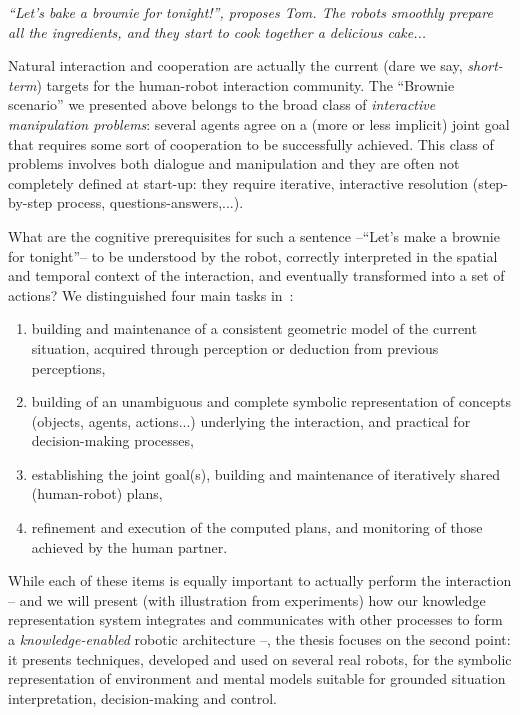 {\em ``\emph{Let's bake a brownie for tonight!}'', proposes Tom. The robots
smoothly prepare all the ingredients, and they start to cook together a
delicious cake...}

Natural interaction and cooperation are actually the current (dare we say,
\emph{short-term}) targets for the human-robot interaction community.  The
``Brownie scenario'' we presented above belongs to the broad class of
\emph{interactive manipulation problems}: several agents agree on a (more or
less implicit) joint goal that requires some sort of cooperation to be
successfully achieved. This class of problems involves both dialogue and
manipulation and they are often not completely defined at start-up: they require
iterative, interactive resolution (step-by-step process,
questions-answers,...).

What are the cognitive prerequisites for such a sentence --``Let's make a
brownie for tonight''-- to be understood by the robot, correctly interpreted in
the spatial and temporal context of the interaction, and eventually transformed
into a set of actions? We distinguished four main tasks in~\cite{Lemaignan2012}:

\begin{enumerate}

    \item building and maintenance of a consistent geometric model of the
        current situation, acquired through perception or deduction from
        previous perceptions,

    \item building of an unambiguous and complete symbolic representation of
    concepts (objects, agents, actions...) underlying the interaction, and
    practical for decision-making processes,

    \item establishing the joint goal(s), building and maintenance of
        iteratively shared (human-robot) plans, 

    \item refinement and execution of the computed plans, and monitoring of
        those achieved by the human partner.

\end{enumerate}

While each of these items is equally important to actually perform the
interaction -- and we will present (with illustration from experiments) how our
knowledge representation system integrates and communicates with other
processes to form a \emph{knowledge-enabled} robotic architecture --, the
thesis focuses on the second point: it presents techniques, developed and used
on several real robots, for the symbolic representation of environment and
mental models suitable for grounded situation interpretation, decision-making
and control.


